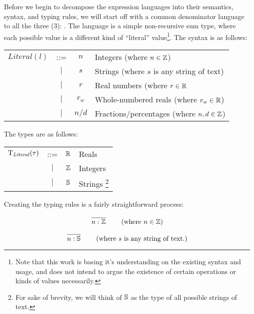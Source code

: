 Before we begin to decompose the expression languages into their semantics,
syntax, and typing rules, we will start off with a common denominator language
to all the three (3): \Literal{}. The \Literal{} language is a simple
non-recursive sum type, where each possible value is a different kind of
``literal'' value\footnote{Note that this work is basing it's understanding on
      the existing syntax and usage, and does not intend to argue the existence of
      certain operations or kinds of values necessarily.}. The syntax is as follows:

\begin{longtable}{ r c c l}
      \(\mathit{Literal}(l)\) & ::=       & \(n\)              & Integers (where \(n \in \mathbb{Z}\))                \\
                              & \(\vert\) & \(s\)              & Strings (where \(s\) is any string of text)      \\
                              & \(\vert\) & \(r\)              & Real numbers (where \(r \in \mathbb{R}\)             \\
                              & \(\vert\) & \(r_w\)            & Whole-numbered reals (where \(r_w \in \mathbb{R}\))  \\
                              & \(\vert\) & \(n \texttt{/} d\) & Fractions/percentages (where \(n,d \in \mathbb{Z}\)) \\
\end{longtable}

The types are as follows:

\begin{longtable}{ r c c l}
      \(\mathrm{T}_{\mathit{Literal}}(\tau)\) & ::=       & \(\mathbb{R}\) & Reals    \\
                                        & \(\vert\) & \(\mathbb{Z}\) & Integers \\
                                        & \(\vert\) & \(\mathbb{S}\) & Strings
      \footnote{For sake of brevity, we will think of \(\mathbb{S}\) as the type of
            all possible strings of text.}
\end{longtable}

Creating the typing rules is a fairly straightforward process:

\begin{equation}
      \left.
      \infer{n : \bb{Z}}{}
      \right.
      \qquad
      \text{(where \(n \in \bb{Z}\))}
      \label{tr:lit:int}
\end{equation}

\begin{equation}
      \left.
      \infer{n : \bb{S}}{}
      \right.
      \qquad
      \text{(where \(s\) is any string of text.)}
      \label{tr:lit:string}
\end{equation}

